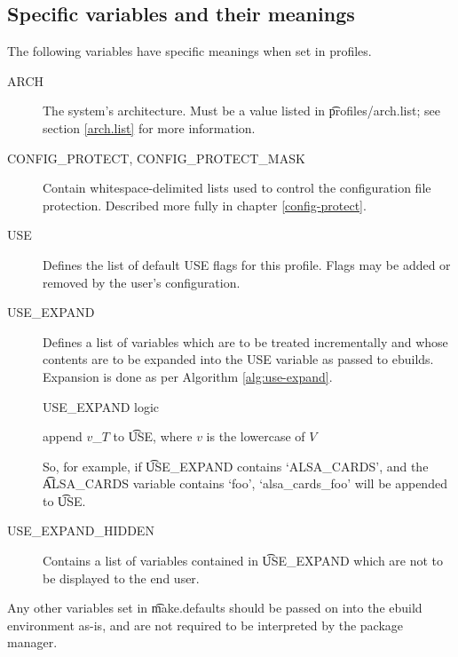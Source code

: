 \subsection{Specific variables and their meanings}
The following variables have specific meanings when set in profiles.
\begin{description}
\item[ARCH] The system's architecture. Must be a value listed in \t{profiles/arch.list}; see section
    \ref{arch.list} for more information.
\item[CONFIG\_PROTECT, CONFIG\_PROTECT\_MASK] Contain whitespace-delimited lists used to control the
    configuration file protection. Described more fully in chapter \ref{config-protect}.
\item[USE] Defines the list of default USE flags for this profile. Flags may be added or removed by
    the user's configuration.
\item[USE\_EXPAND] \label{use-expand} Defines a list of variables which are to be treated
    incrementally and whose contents are to be expanded into the USE variable as passed to ebuilds.
    Expansion is done as per Algorithm \ref{alg:use-expand}.
    \begin{algorithm}
    \caption{USE\_EXPAND logic} \label{alg:use-expand}
    \begin{algorithmic}
                \STATE append $v$\_$T$ to \t{USE}, where $v$ is the lowercase of $V$
            \ENDFOR
        \ENDFOR
    \end{algorithmic}
    \end{algorithm}
    So, for example, if \t{USE\_EXPAND} contains `ALSA\_CARDS', and the \t{ALSA\_CARDS} variable
    contains `foo', `alsa\_cards\_foo' will be appended to \t{USE}.
\item[USE\_EXPAND\_HIDDEN] Contains a list of variables contained in \t{USE\_EXPAND} which are not
    to be displayed to the end user.
\end{description}

Any other variables set in \t{make.defaults} should be passed on into the ebuild environment as-is,
and are not required to be interpreted by the package manager.

